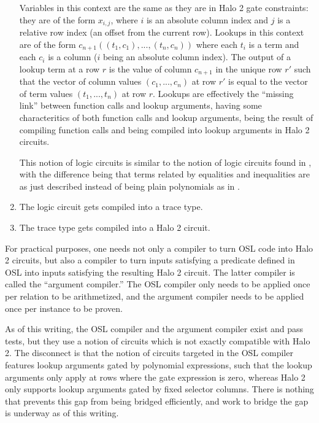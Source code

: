 \documentclass[11pt]{article}
\begin{document}
\begin{enumerate}
		Variables in this context are the same as they are in Halo 2 gate constraints: they are of the form $x_{i,j}$, where $i$ is an absolute column index and $j$ is a relative row index (an offset from the current row). Lookups in this context are of the form $c_{n+1}((t_1, c_1), ..., (t_n, c_n))$ where each $t_i$ is a term and each $c_i$ is a column ($i$ being an absolute column index). The output of a lookup term at a row $r$ is the value of column $c_{n+1}$ in the unique row $r'$ such that the vector of column values $(c_1, ..., c_n)$ at row $r'$ is equal to the vector of term values $(t_1, ..., t_n)$ at row $r$. Lookups are effectively the ``missing link'' between function calls and lookup arguments, having some characteritics of both function calls and lookup arguments, being the result of compiling function calls and being compiled into lookup arguments in Halo 2 circuits.

		This notion of logic circuits is similar to the notion of logic circuits found in \cite{sigma11-poly-bounds}, with the difference being that terms related by equalities and inequalities are as just described instead of being plain polynomials as in \cite{sigma11-poly-bounds}.

	\item The logic circuit gets compiled into a trace type.
	\item The trace type gets compiled into a Halo 2 circuit.
\end{enumerate}

For practical purposes, one needs not only a compiler to turn OSL code into Halo 2 circuits, but also a compiler to turn inputs satisfying a predicate defined in OSL into inputs satisfying the resulting Halo 2 circuit. The latter compiler is called the ``argument compiler.'' The OSL compiler only needs to be applied once per relation to be arithmetized, and the argument compiler needs to be applied once per instance to be proven.

As of this writing, the OSL compiler and the argument compiler exist and pass tests, but they use a notion of circuits which is not exactly compatible with Halo 2. The disconnect is that the notion of circuits targeted in the OSL compiler features lookup arguments gated by polynomial expressions, such that the lookup arguments only apply at rows where the gate expression is zero, whereas Halo 2 only supports lookup arguments gated by fixed selector columns. There is nothing that prevents this gap from being bridged efficiently, and work to bridge the gap is underway as of this writing.
\end{document}
